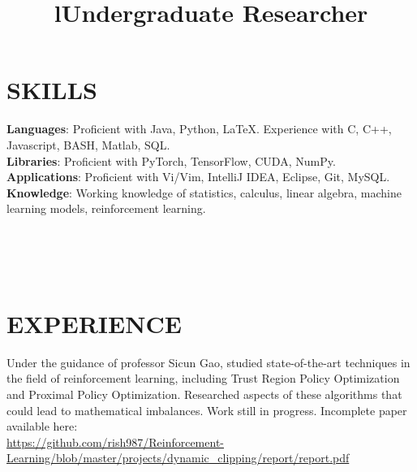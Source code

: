 \documentclass[margin]{res}
\begin{document}
\begin{resume}


\section{SKILLS}

\textbf{Languages}: 
Proficient with Java, Python, \LaTeX.
Experience with C, C++, Javascript, BASH, Matlab, SQL.
\\
\textbf{Libraries}: 
Proficient with PyTorch, TensorFlow, CUDA, NumPy.
\\
\textbf{Applications}: Proficient with Vi/Vim, IntelliJ IDEA, Eclipse, Git,
MySQL.  
\\
\textbf{Knowledge}: Working knowledge of statistics, calculus, linear algebra,
machine learning models, reinforcement learning.

\begin{format}
\title{l}\\
\\
\body\\
\end{format}

\section{EXPERIENCE}
\title{\textbf{Undergraduate Researcher}}
\begin{position}
Under the guidance of professor Sicun Gao, studied state-of-the-art techniques
in the field of reinforcement learning, including Trust Region Policy
Optimization and Proximal Policy Optimization.  Researched aspects of these
algorithms that could lead to mathematical imbalances. Work still in progress.
Incomplete paper available here:\\
    \url{https://github.com/rish987/Reinforcement-Learning/blob/master/projects/dynamic_clipping/report/report.pdf}
\end{position}


\end{resume}
\end{document}
